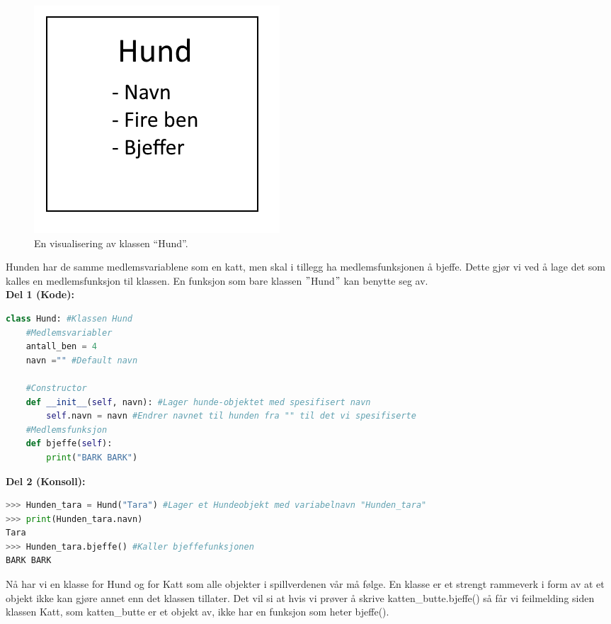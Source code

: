 \begin{figure}[H]
    \centering
    \includegraphics[scale=0.5]{Figures/Klasser_hund.png}
    \caption{En visualisering av klassen ``Hund''.}
    \label{fig:klasse_hund}
\end{figure}

Hunden har de samme medlemsvariablene som en katt, men skal i tillegg ha medlemsfunksjonen å bjeffe. Dette gjør vi ved å lage det som kalles en medlemsfunksjon til klassen. En funksjon som bare klassen $"$Hund$"$ kan benytte seg av.\\[0.5cm]
\textbf{Del 1 (Kode):}
\begin{lstlisting}[language=python]
class Hund: #Klassen Hund
    #Medlemsvariabler
    antall_ben = 4 
    navn ="" #Default navn
    
    #Constructor
    def __init__(self, navn): #Lager hunde-objektet med spesifisert navn
        self.navn = navn #Endrer navnet til hunden fra "" til det vi spesifiserte
    #Medlemsfunksjon
    def bjeffe(self): 
        print("BARK BARK")
\end{lstlisting}
\textbf{Del 2 (Konsoll):}
\begin{lstlisting}[language=python]
>>> Hunden_tara = Hund("Tara") #Lager et Hundeobjekt med variabelnavn "Hunden_tara"
>>> print(Hunden_tara.navn) 
Tara
>>> Hunden_tara.bjeffe() #Kaller bjeffefunksjonen
BARK BARK
\end{lstlisting}

Nå har vi en klasse for Hund og for Katt som alle objekter i spillverdenen vår må følge. En klasse er et strengt rammeverk i form av at et objekt ikke kan gjøre annet enn det klassen tillater. Det vil si at hvis vi prøver å skrive katten\_butte.bjeffe() så får vi feilmelding siden klassen Katt, som katten\_butte er et objekt av, ikke har en funksjon som heter bjeffe(). 

